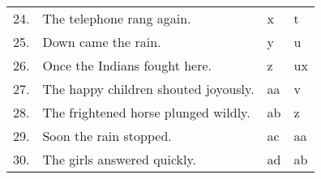 \begin{tabular}{rlll}
24.&The telephone rang again.              &x &{\confont t} \\
25.&Down came the rain.                    &y &{\confont u} \\
26.&Once the Indians fought here.          &z &{\confont ux}\\
27.&The happy children shouted joyously.   &aa&{\confont v} \\
28.&The frightened horse plunged wildly.   &ab&{\confont z} \\
29.&Soon the rain stopped.                 &ac&{\confont aa}\\
30.&The girls answered quickly.            &ad&{\confont ab}\\
\end{tabular}

